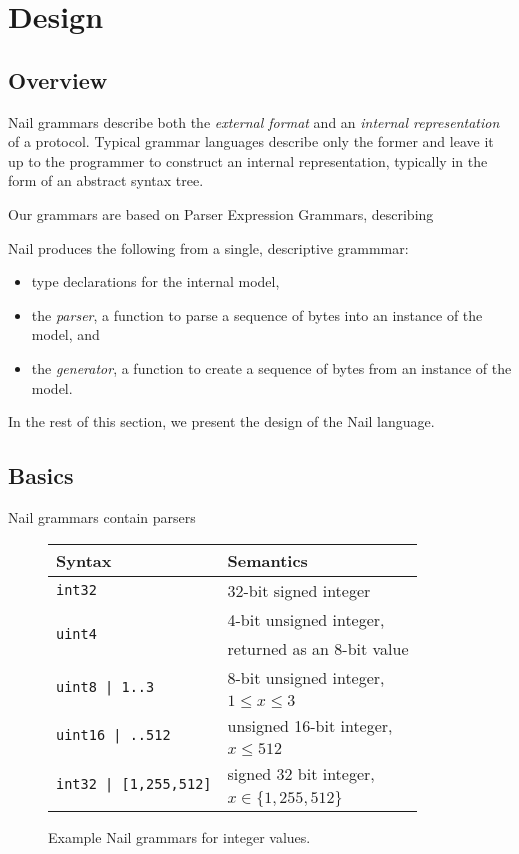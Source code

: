 \section{Design}
\label{s:design}

\subsection{Overview}
 
Nail grammars describe both the \emph{external format} and an \emph{internal representation} of a
protocol. Typical grammar languages describe only the former and leave it up to the programmer to
construct an internal representation, typically in the form of an abstract syntax tree. 

Our grammars are based on Parser Expression Grammars, describing 



Nail produces the following from a single, descriptive grammmar: 

\begin{itemize}
\item type declarations for the internal model,
\item the \textit{parser}, a function to parse a sequence of bytes into an
instance of the model, and
\item the \textit{generator}, a function to create a
sequence of bytes from an instance of the model.
\end{itemize}

\noindent
In the rest of this section, we present the design of the Nail language.

\subsection{Basics}
Nail grammars contain parsers
\begin{figure}[tb]
\begin{tabular}{ll}
\toprule
\bf Syntax & \bf Semantics \\
\midrule
\texttt{int32} & 32-bit signed integer \\
\multirow{2}{*}{\texttt{uint4}}
  & 4-bit unsigned integer, \\
  & returned as an 8-bit value \\
\multirow{2}{*}{\texttt{uint8 | 1..3}}
  & 8-bit unsigned integer, \\
  & $1\leq x \leq 3$ \\
\multirow{2}{*}{\texttt{uint16 | ..512}}
  & unsigned 16-bit integer, \\
  & $x \leq 512$ \\
\multirow{2}{*}{\texttt{int32 | [1,255,512]}}
  & signed 32 bit integer, \\
  & $x \in \{ 1, 255, 512 \}$ \\
\bottomrule
\end{tabular}
\caption{Example Nail grammars for integer values.}
\label{fig:range}
\end{figure}

